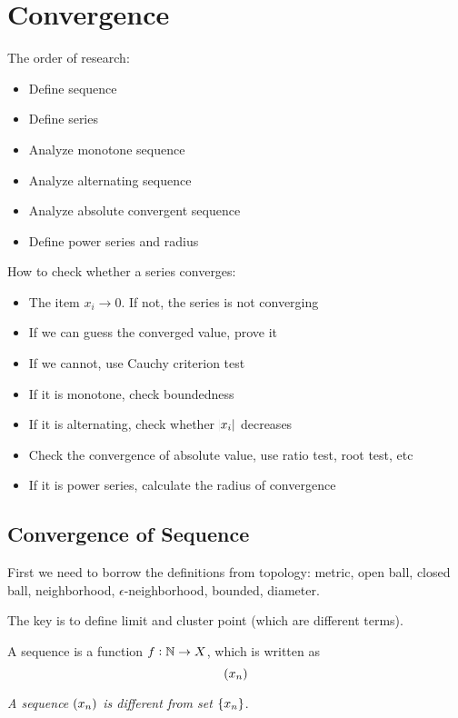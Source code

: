 \chapter{Convergence}

The order of research:
\begin{itemize}
    \item Define sequence    
    \item Define series
    \item Analyze monotone sequence
    \item Analyze alternating sequence
    \item Analyze absolute convergent sequence
    \item Define power series and radius
\end{itemize}


How to check whether a series converges:
\begin{itemize}
    \item The item $x_i \rightarrow 0$. If not, the series is not converging
    \item If we can guess the converged value, prove it
    \item If we cannot, use Cauchy criterion test
    \item If it is monotone, check boundedness
    \item If it is alternating, check whether $\abs{x_i}$ decreases
    \item Check the convergence of absolute value, use ratio test, root test, etc
    \item If it is power series, calculate the radius of convergence
\end{itemize}

%
%
%
%

\section{Convergence of Sequence}

First we need to borrow the definitions from topology: metric, open ball, closed ball, neighborhood, $\epsilon$-neighborhood, bounded, diameter.

The key is to define limit and cluster point (which are different terms).

\begin{definition}
    A sequence is a function $f: \mathbb{N} \rightarrow X$, which is written as
    \begin{equation}
        \sequence{x_n}
    \end{equation}
    
    \emph{A sequence $\sequence{x_n}$ is different from set $\set{x_n}$}.
\end{definition}

